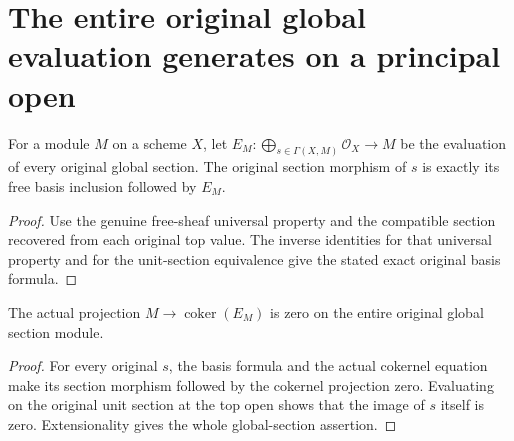 \section{The entire original global evaluation generates on a principal open}

\begin{definition}
\label{def:scheme-module-all-global-evaluation}
\leanok
{}
For a module $M$ on a scheme $X$, let
$E_M:\bigoplus_{s\in\Gamma(X,M)}\mathcal O_X\to M$
be the evaluation of every original global section. The original
section morphism of $s$ is exactly its free basis inclusion
followed by $E_M$.
\end{definition}
\begin{proof}
Use the genuine free-sheaf universal property and the compatible
section recovered from each original top value. The inverse
identities for that universal property and for the unit-section
equivalence give the stated exact original basis formula.
\end{proof}

\begin{lemma}
\label{lem:scheme-module-evaluation-cokernel-top}
\leanok
{}
The actual projection $M\to\operatorname{coker}(E_M)$ is zero
on the entire original global section module.
\end{lemma}
\begin{proof}
For every original $s$, the basis formula and the actual cokernel
equation make its section morphism followed by the cokernel
projection zero. Evaluating on the original unit section at the
top open shows that the image of $s$ itself is zero. Extensionality
gives the whole global-section assertion.
\end{proof}

